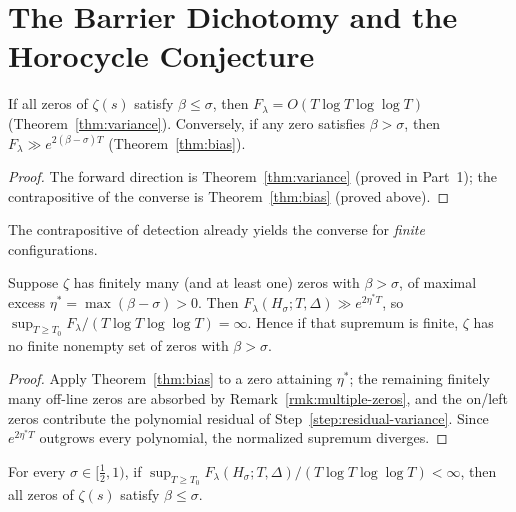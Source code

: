 \section{The Barrier Dichotomy and the Horocycle Conjecture}\label{sec:barrier}

\begin{proposition}\label{prop:barrier}
If all zeros of $\zeta(s)$ satisfy $\beta\le\sigma$, then
$F_\lambda=O(T\log T\log\log T)$
\textup{(Theorem~\ref{thm:variance})}.
Conversely, if any zero satisfies $\beta>\sigma$, then
$F_\lambda\gg e^{2(\beta-\sigma)T}$
\textup{(Theorem~\ref{thm:bias})}.
\end{proposition}

\begin{proof}
The forward direction is Theorem~\ref{thm:variance} (proved in Part~1);
the contrapositive of the converse is Theorem~\ref{thm:bias} (proved above).
\end{proof}

The contrapositive of detection already yields the converse for \emph{finite}
configurations.

\begin{proposition}\label{prop:finite-converse}
Suppose $\zeta$ has finitely many \textup{(}and at least one\textup{)} zeros with
$\beta>\sigma$, of maximal excess $\eta^\ast=\max(\beta-\sigma)>0$.  Then
$F_\lambda(H_\sigma;T,\Delta)\gg e^{2\eta^\ast T}$, so
$\sup_{T\ge T_0}F_\lambda/(T\log T\log\log T)=\infty$.  Hence if that supremum is
finite, $\zeta$ has no finite nonempty set of zeros with $\beta>\sigma$.
\end{proposition}

\begin{proof}
Apply Theorem~\ref{thm:bias} to a zero attaining $\eta^\ast$; the remaining
finitely many off-line zeros are absorbed by Remark~\ref{rmk:multiple-zeros}, and
the on/left zeros contribute the polynomial residual of
Step~\ref{step:residual-variance}.  Since $e^{2\eta^\ast T}$ outgrows every
polynomial, the normalized supremum diverges.
\end{proof}

\begin{conjecture}\label{conj:horocycle}
For every $\sigma\in[\tfrac12,1)$, if
$\sup_{T\ge T_0} F_\lambda(H_\sigma;T,\Delta)/(T\log T\log\log T)<\infty$,
then all zeros of $\zeta(s)$ satisfy $\beta\le\sigma$.
\end{conjecture}

